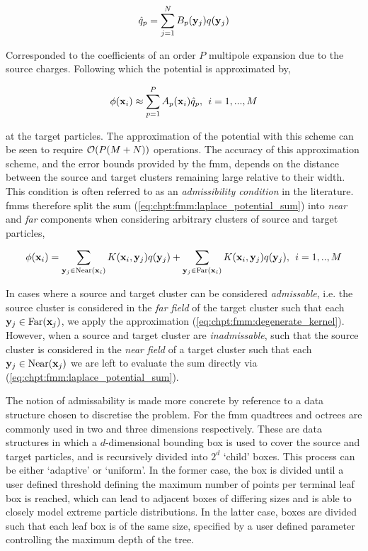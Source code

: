\begin{equation}
    \hat{q}_p = \sum_{j=1}^N B_p(\mathbf{y}_j)q(\mathbf{y}_j)
\end{equation}

Corresponded to the coefficients of an order $P$ multipole expansion due to the source charges. Following which the potential is approximated by,

\begin{equation}
    \phi(\mathbf{x}_i) \approx \sum_{p=1}^P A_p(\mathbf{x}_i)\hat{q}_p, \> \> i = 1,...,M
\end{equation}

at the target particles. The approximation of the potential with this scheme can be seen to require $\mathcal{O}(P(M+N))$ operations. The accuracy of this approximation scheme, and the error bounds provided by the \acrshort{fmm}, depends on the distance between the source and target clusters remaining large relative to their width. This condition is often referred to as an \textit{admissibility condition} in the literature. \acrshort{fmm}s therefore split the sum (\ref{eq:chpt:fmm:laplace_potential_sum}) into \textit{near} and \textit{far} components when considering arbitrary clusters of source and target particles,

\begin{equation}
    \phi(\mathbf{x}_i) = \sum_{\mathbf{y}_j \in \text{Near}(\mathbf{x}_i)} K(\mathbf{x}_i, \mathbf{y}_j) q(\mathbf{y}_j) +  \sum_{\mathbf{y}_j \in \text{Far}(\mathbf{x}_i)} K(\mathbf{x}_i, \mathbf{y}_j) q(\mathbf{y}_j), \> \> i=1,..,M
    \label{eq:chpt:fmm:near_far_split}
\end{equation}

In cases where a source and target cluster can be considered \textit{admissable}, i.e. the source cluster is considered in the \textit{far field} of the target cluster such that each $\mathbf{y}_j \in \text{Far}(\mathbf{x}_j)$, we apply the approximation (\ref{eq:chpt:fmm:degenerate_kernel}). However, when a source and target cluster are \textit{inadmissable}, such that the source cluster is considered in the \textit{near field} of a target cluster such that each $\mathbf{y}_j \in \text{Near}(\mathbf{x}_j)$ we are left to evaluate the sum directly via (\ref{eq:chpt:fmm:laplace_potential_sum}).

The notion of admissability is made more concrete by reference to a data structure chosen to discretise the problem. For the \acrshort{fmm} quadtrees and octrees are commonly used in two and three dimensions respectively. These are data structures in which a $d$-dimensional bounding box is used to cover the source and target particles, and is recursively divided into $2^d$ `child' boxes. This process can be either `adaptive' or `uniform'. In the former case, the box is divided until a user defined threshold defining the maximum number of points per terminal leaf box is reached, which can lead to adjacent boxes of differing sizes and is able to closely model extreme particle distributions. In the latter case, boxes are divided such that each leaf box is of the same size, specified by a user defined parameter controlling the maximum depth of the tree.



